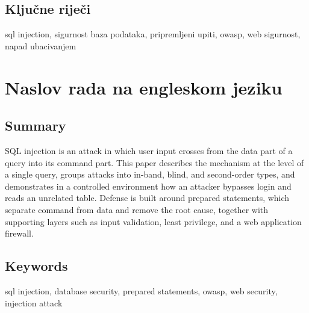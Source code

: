 \documentclass{mathos}
\begin{document}
\section*{Ključne riječi}

sql injection, sigurnost baza podataka, pripremljeni upiti, owasp, web sigurnost, napad ubacivanjem


\chapter*{Naslov rada na engleskom jeziku}

\section*{Summary}

SQL injection is an attack in which user input crosses from the data part of a query into its command part. This paper describes the mechanism at the level of a single query, groups attacks into in-band, blind, and second-order types, and demonstrates in a controlled environment how an attacker bypasses login and reads an unrelated table. Defense is built around prepared statements, which separate command from data and remove the root cause, together with supporting layers such as input validation, least privilege, and a web application firewall.

\section*{Keywords}

sql injection, database security, prepared statements, owasp, web security, injection attack
\end{document}
